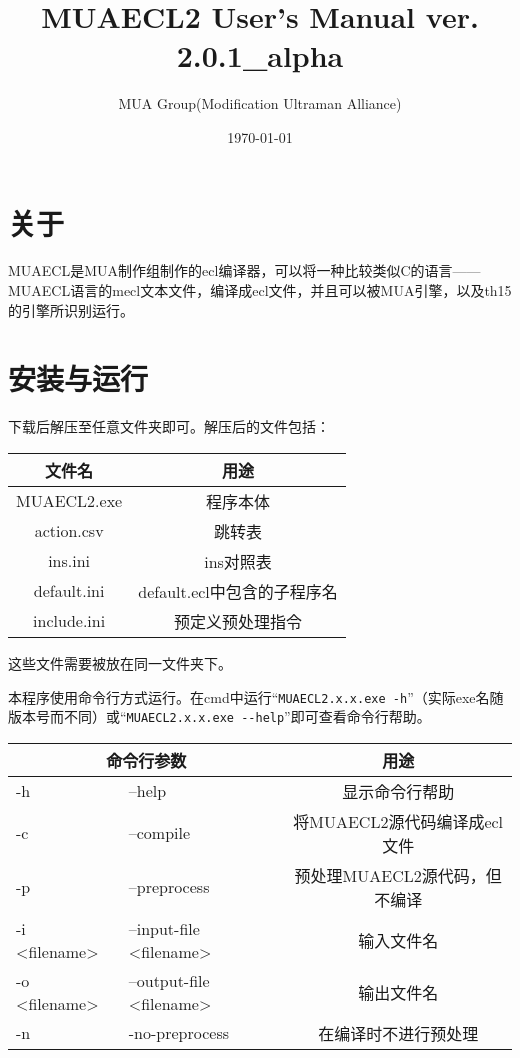 \documentclass[UTF8]{ctexart}
\author{MUA Group(Modification Ultraman Alliance)}
\title{MUAECL2 User's Manual  ver. 2.0.1\_alpha}
\date{\today}
\begin{document}
\maketitle
\tableofcontents
\clearpage

\section{关于}

MUAECL是MUA制作组制作的ecl编译器，可以将一种比较类似C的语言——MUAECL语言的mecl文本文件，编译成ecl文件，并且可以被MUA引擎，以及th15的引擎所识别运行。

\section{安装与运行}

下载后解压至任意文件夹即可。解压后的文件包括：

\begin{table}[H]
	\centering
	\begin{tabular}{c|c}
		\hline
		文件名 & 用途 \\\hline
		MUAECL2.exe & 程序本体 \\\hline
		action.csv & 跳转表 \\\hline
		ins.ini & ins对照表 \\\hline
		default.ini & default.ecl中包含的子程序名 \\\hline
		include.ini & 预定义预处理指令 \\\hline
	\end{tabular}
\end{table}

这些文件需要被放在同一文件夹下。

本程序使用命令行方式运行。在cmd中运行``\verb|MUAECL2.x.x.exe -h|''（实际exe名随版本号而不同）或``\verb|MUAECL2.x.x.exe --help|''即可查看命令行帮助。

\begin{table}[H]
	\centering
	\begin{tabular}{l|l|c}
		\hline
		\multicolumn{2}{c|}{命令行参数} & 用途 \\\hline
		-h & --help & 显示命令行帮助 \\\hline
		-c & --compile & 将MUAECL2源代码编译成ecl文件 \\\hline
		-p & --preprocess & 预处理MUAECL2源代码，但不编译 \\\hline
		-i <filename> & --input-file <filename> & 输入文件名 \\\hline
		-o <filename> & --output-file <filename> & 输出文件名 \\\hline
		-n & -no-preprocess & 在编译时不进行预处理 \\\hline
	\end{tabular}
\end{table}
\end{document}
